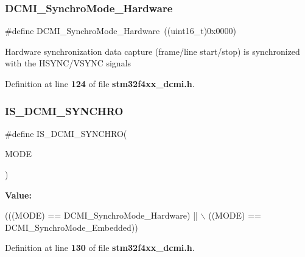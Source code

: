 \mbox{\label{group__DCMI__Synchronization__Mode_ga03d983bb911952d7f84783d5999a9559}} 
\subsubsection{D\+C\+M\+I\+\_\+\+Synchro\+Mode\+\_\+\+Hardware}
{\footnotesize\ttfamily \#define D\+C\+M\+I\+\_\+\+Synchro\+Mode\+\_\+\+Hardware~((uint16\+\_\+t)0x0000)}

Hardware synchronization data capture (frame/line start/stop) is synchronized with the H\+S\+Y\+N\+C/\+V\+S\+Y\+NC signals 

Definition at line \textbf{ 124} of file \textbf{ stm32f4xx\+\_\+dcmi.\+h}.

\mbox{\label{group__DCMI__Synchronization__Mode_ga0f713dc8c5762ecb08ca40f90f7cf1cb}} 
\subsubsection{I\+S\+\_\+\+D\+C\+M\+I\+\_\+\+S\+Y\+N\+C\+H\+RO}
{\footnotesize\ttfamily \#define I\+S\+\_\+\+D\+C\+M\+I\+\_\+\+S\+Y\+N\+C\+H\+RO(\begin{DoxyParamCaption}\item[{}]{M\+O\+DE }\end{DoxyParamCaption})}

{\bfseries Value\+:}
\begin{DoxyCode}
(((MODE) == DCMI_SynchroMode_Hardware) || \(\backslash\)
                              ((MODE) == DCMI_SynchroMode_Embedded))
\end{DoxyCode}


Definition at line \textbf{ 130} of file \textbf{ stm32f4xx\+\_\+dcmi.\+h}.

